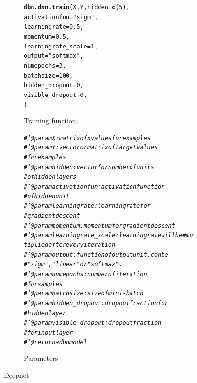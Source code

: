 \documentclass[letter,8pt]{article}\usepackage[]{graphicx}\usepackage[]{color}
\makeatletter
\newcommand{\hlnum}[1]{\textcolor[rgb]{0.686,0.059,0.569}{#1}}%
\newcommand{\hlstr}[1]{\textcolor[rgb]{0.192,0.494,0.8}{#1}}%
\newcommand{\hlcom}[1]{\textcolor[rgb]{0.678,0.584,0.686}{\textit{#1}}}%
\newcommand{\hlstd}[1]{\textcolor[rgb]{0.345,0.345,0.345}{#1}}%
\newcommand{\hlkwc}[1]{\textcolor[rgb]{0.333,0.667,0.333}{#1}}%
\newcommand{\hlkwd}[1]{\textcolor[rgb]{0.737,0.353,0.396}{\textbf{#1}}}%
\newenvironment{kframe}{%
 \def\at@end@of@kframe{}%
 \ifinner\ifhmode%
  \def\at@end@of@kframe{\end{minipage}}%
  \begin{minipage}{\columnwidth}%
 \fi\fi%
 \def\FrameCommand##1{\hskip\@totalleftmargin \hskip-\fboxsep
 \colorbox{shadecolor}{##1}\hskip-\fboxsep
     \hskip-\linewidth \hskip-\@totalleftmargin \hskip\columnwidth}%
 \MakeFramed {\advance\hsize-\width
   \@totalleftmargin\z@ \linewidth\hsize
   \@setminipage}}%
 {\par\unskip\endMakeFramed%
 \at@end@of@kframe}
\newenvironment{knitrout}{}{} %
\makeatother
\begin{document}
\begin{figure}[H]
  \begin{subfigure}{0.5\textwidth}
\begin{knitrout}
\color{fgcolor}\begin{kframe}
\begin{alltt}
\hlkwd{dbn.dnn.train}\hlstd{(X, Y,} \hlkwc{hidden}\hlstd{=}\hlkwd{c}\hlstd{(}\hlnum{5}\hlstd{),}
              \hlkwc{activationfun}\hlstd{=}\hlstr{"sigm"}\hlstd{,}
              \hlkwc{learningrate}\hlstd{=}\hlnum{0.5}\hlstd{,}
              \hlkwc{momentum}\hlstd{=}\hlnum{0.5}\hlstd{,}
              \hlkwc{learningrate_scale}\hlstd{=}\hlnum{1}\hlstd{,}
              \hlkwc{output}\hlstd{=}\hlstr{"softmax"}\hlstd{,}
              \hlkwc{numepochs} \hlstd{=} \hlnum{3}\hlstd{,}
              \hlkwc{batchsize} \hlstd{=} \hlnum{100}\hlstd{,}
              \hlkwc{hidden_dropout} \hlstd{=} \hlnum{0}\hlstd{,}
              \hlkwc{visible_dropout} \hlstd{=} \hlnum{0}\hlstd{,}
              \hlstd{)}
\end{alltt}
\end{kframe}
\end{knitrout}
    \caption{Training function}
  \end{subfigure}
  \begin{subfigure}{0.5\textwidth}
    \centering
\begin{knitrout}
\color{fgcolor}\begin{kframe}
\begin{alltt}
\hlcom{#' @param X : matrix of x values for examples}
\hlcom{#' @param Y : vector or matrix of target values }
\hlcom{#         for examples}
\hlcom{#' @param hidden : vector for number of units }
\hlcom{#         of hidden layers}
\hlcom{#' @param activationfun : activation function }
\hlcom{#         of hidden unit }
\hlcom{#' @param learningrate : learning rate for }
\hlcom{#         gradient descent}
\hlcom{#' @param momentum : momentum for gradient descent}
\hlcom{#' @param learningrate_scale :learning rate will be          #         mutiplied after every iteration}
\hlcom{#' @param output : function of output unit, can be}
\hlcom{#         "sigm","linear" or "softmax".}
\hlcom{#' @param numepochs : number of iteration }
\hlcom{#         for samples}
\hlcom{#' @param batchsize : size of mini-batch}
\hlcom{#' @param hidden_dropout : drop out fraction for}
\hlcom{#         hidden layer}
\hlcom{#' @param visible_dropout : drop out fraction }
\hlcom{#         for input layer}
\hlcom{#' @return a dbn model}
\end{alltt}
\end{kframe}
\end{knitrout}
    \caption{Parameters}
  \end{subfigure}
    \caption{Deepnet}
\end{figure}
\end{document}
